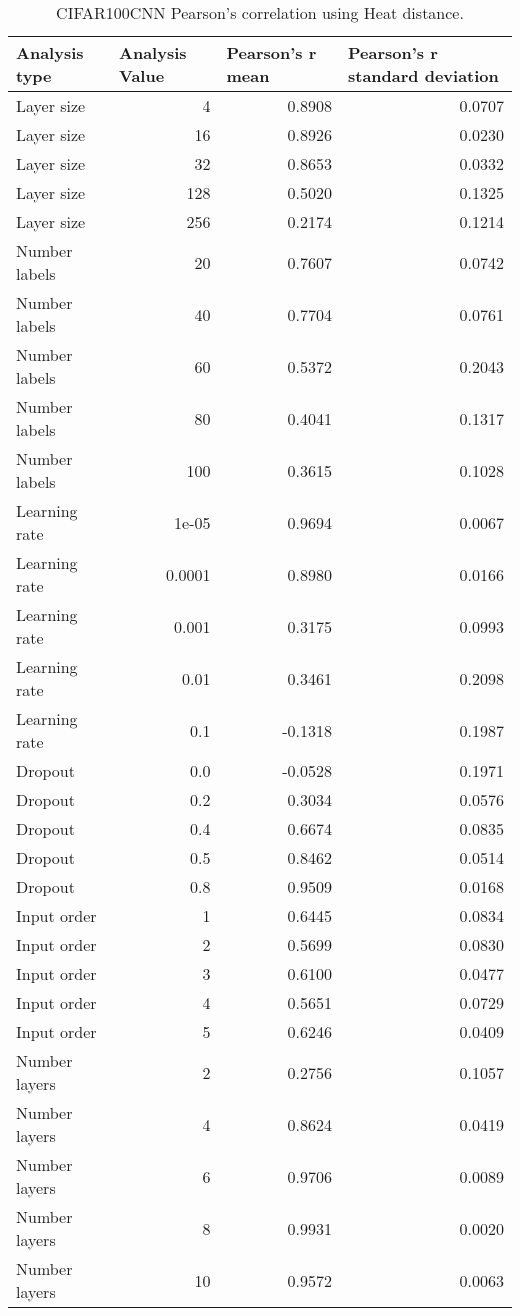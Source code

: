 \documentclass{article}
\begin{document}
\begin{table}[H]
\centering
\begin{tabular}{@{}lrrr@{}}
\toprule
Analysis type & \multicolumn{1}{l}{Analysis Value} & \multicolumn{1}{l}{Pearson's r mean} & \multicolumn{1}{l}{Pearson's r standard deviation} \\ \midrule
Layer size & 4 & 0.8908 & 0.0707 \\ 
Layer size & 16 & 0.8926 & 0.0230 \\ 
Layer size & 32 & 0.8653 & 0.0332 \\ 
Layer size & 128 & 0.5020 & 0.1325 \\ 
Layer size & 256 & 0.2174 & 0.1214 \\ 
Number labels & 20 & 0.7607 & 0.0742 \\ 
Number labels & 40 & 0.7704 & 0.0761 \\ 
Number labels & 60 & 0.5372 & 0.2043 \\ 
Number labels & 80 & 0.4041 & 0.1317 \\ 
Number labels & 100 & 0.3615 & 0.1028 \\ 
Learning rate & 1e-05 & 0.9694 & 0.0067 \\ 
Learning rate & 0.0001 & 0.8980 & 0.0166 \\ 
Learning rate & 0.001 & 0.3175 & 0.0993 \\ 
Learning rate & 0.01 & 0.3461 & 0.2098 \\ 
Learning rate & 0.1 & -0.1318 & 0.1987 \\ 
Dropout & 0.0 & -0.0528 & 0.1971 \\ 
Dropout & 0.2 & 0.3034 & 0.0576 \\ 
Dropout & 0.4 & 0.6674 & 0.0835 \\ 
Dropout & 0.5 & 0.8462 & 0.0514 \\ 
Dropout & 0.8 & 0.9509 & 0.0168 \\ 
Input order & 1 & 0.6445 & 0.0834 \\ 
Input order & 2 & 0.5699 & 0.0830 \\ 
Input order & 3 & 0.6100 & 0.0477 \\ 
Input order & 4 & 0.5651 & 0.0729 \\ 
Input order & 5 & 0.6246 & 0.0409 \\ 
Number layers & 2 & 0.2756 & 0.1057 \\ 
Number layers & 4 & 0.8624 & 0.0419 \\ 
Number layers & 6 & 0.9706 & 0.0089 \\ 
Number layers & 8 & 0.9931 & 0.0020 \\ 
Number layers & 10 & 0.9572 & 0.0063 \\ 
\bottomrule
\end{tabular}
\caption{CIFAR100CNN Pearson's correlation using Heat distance.}
\end{table}
\end{document}

